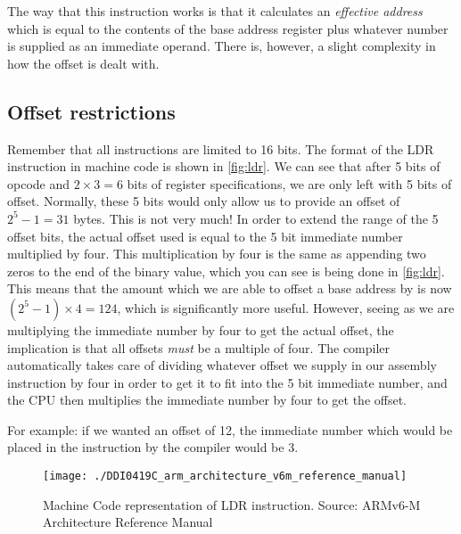 The way that this instruction works is that it calculates an \emph{effective address} which is equal to the contents of the base address register plus whatever number is supplied as an immediate operand.
There is, however, a slight complexity in how the offset is dealt with.

\subsection{Offset restrictions}
\label{sec:load-store-restrictions}
Remember that all instructions are limited to 16 bits. The format of the LDR instruction in machine code is shown in \autoref{fig:ldr}. We can see that after 5 bits of opcode and $2 \times 3 = 6$ bits of register specifications, we are only left with 5 bits of offset. Normally, these 5 bits would only allow us to provide an offset of $2^5 - 1 = 31$ bytes. This is not very much! In order to extend the range of the 5 offset bits, the actual offset used is equal to the 5 bit immediate number multiplied by four. This multiplication by four is the same as appending two zeros to the end of the binary value, which you can see is being done in \autoref{fig:ldr}. This means that the amount which we are able to offset a base address by is now $(2^5 - 1) \times 4 = 124$, which is significantly more useful. However, seeing as we are multiplying the immediate number by four to get the actual offset, the implication is that all offsets \emph{must} be a multiple of four. 
The compiler automatically takes care of dividing whatever offset we supply in our assembly instruction by four in order to get it to fit into the 5 bit immediate number, and the CPU then multiplies the immediate number by four to get the offset.

For example: if we wanted an offset of 12, the immediate number which would be placed in the instruction by the compiler would be 3.

\begin{figure}
\centering
\texttt{[image: ./DDI0419C\_arm\_architecture\_v6m\_reference\_manual]}
\caption{Machine Code representation of LDR instruction. Source: ARMv6-M Architecture Reference Manual}
\label{fig:ldr}
\end{figure}

